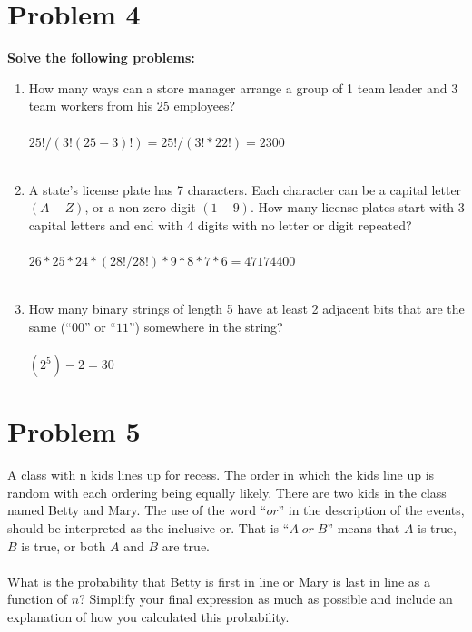 \documentclass{amsart}
\theoremstyle{definition}
\theoremstyle{Exercise}
\theoremstyle{remark}
\theoremstyle{rule}
\numberwithin{equation}{section}
\begin{document}
  \section*{Problem 4}
  {\bf Solve the following problems:}
  \begin{enumerate}[label=(\alph*)]
    \item How many ways can a store manager arrange a group of 1 team leader and 3 team workers from his 25 employees?
\\\\
  $25!/(3!(25−3)!) = 25!/(3!*22!) = 2300$
\\\\
    \item A state’s license plate has 7 characters. Each character can be a capital letter $(A-Z)$, or a non-zero digit $(1-9)$. How many license plates start with 3 capital letters and end with 4 digits with no letter or digit repeated?
\\\\
  $26*25*24*(28!/28!)*9*8*7*6 = 47174400$
\\\\
    \item How many binary strings of length 5 have at least 2 adjacent bits that are the same (``$00$'' or ``$11$'') somewhere in the string?
\\\\
  $(2^5)-2 = 30$

  \end{enumerate}
\newpage
  \section*{Problem 5}
  A class with n kids lines up for recess. The order in which the kids line up is random with each ordering being equally likely. There are two kids in the class named Betty and Mary. The use of the word ``$or$'' in the description of the events, should be interpreted as the inclusive or. That is ``$A \;or\; B$'' means that $A$ is true, $B$ is true, or both $A$ and $B$ are true.\\\\
  What is the probability that Betty is first in line or Mary is last in line as a function of $n$? Simplify your final expression as much as possible and include an explanation of how you calculated this probability.
\\\\
\end{document}
